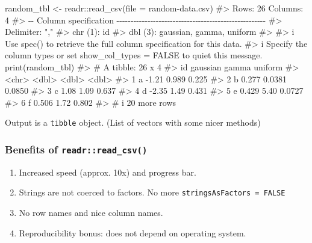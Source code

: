 \documentclass[
  letterpaper,
  DIV=11,
  numbers=noendperiod]{scrreprt}
\newenvironment{Shaded}{\begin{snugshade}}{\end{snugshade}}
\newcommand{\AttributeTok}[1]{\textcolor[rgb]{0.40,0.45,0.13}{#1}}
\newcommand{\CommentTok}[1]{\textcolor[rgb]{0.37,0.37,0.37}{#1}}
\newcommand{\FunctionTok}[1]{\textcolor[rgb]{0.28,0.35,0.67}{#1}}
\newcommand{\NormalTok}[1]{\textcolor[rgb]{0.00,0.23,0.31}{#1}}
\newcommand{\OtherTok}[1]{\textcolor[rgb]{0.00,0.23,0.31}{#1}}
\newcommand{\SpecialCharTok}[1]{\textcolor[rgb]{0.37,0.37,0.37}{#1}}
\newcommand{\StringTok}[1]{\textcolor[rgb]{0.13,0.47,0.30}{#1}}
\begin{document}
\begin{Shaded}
\begin{Highlighting}[]
\NormalTok{random\_tbl }\OtherTok{\textless{}{-}}\NormalTok{ readr}\SpecialCharTok{::}\FunctionTok{read\_csv}\NormalTok{(}\AttributeTok{file =} \StringTok{\textquotesingle{}random{-}data.csv\textquotesingle{}}\NormalTok{)}
\CommentTok{\#\textgreater{} Rows: 26 Columns: 4}
\CommentTok{\#\textgreater{} {-}{-} Column specification {-}{-}{-}{-}{-}{-}{-}{-}{-}{-}{-}{-}{-}{-}{-}{-}{-}{-}{-}{-}{-}{-}{-}{-}{-}{-}{-}{-}{-}{-}{-}{-}{-}{-}{-}{-}{-}{-}{-}{-}{-}{-}{-}{-}{-}{-}{-}{-}{-}{-}{-}{-}{-}}
\CommentTok{\#\textgreater{} Delimiter: ","}
\CommentTok{\#\textgreater{} chr (1): id}
\CommentTok{\#\textgreater{} dbl (3): gaussian, gamma, uniform}
\CommentTok{\#\textgreater{} }
\CommentTok{\#\textgreater{} i Use \textasciigrave{}spec()\textasciigrave{} to retrieve the full column specification for this data.}
\CommentTok{\#\textgreater{} i Specify the column types or set \textasciigrave{}show\_col\_types = FALSE\textasciigrave{} to quiet this message.}
\FunctionTok{print}\NormalTok{(random\_tbl)}
\CommentTok{\#\textgreater{} \# A tibble: 26 x 4}
\CommentTok{\#\textgreater{}   id    gaussian  gamma uniform}
\CommentTok{\#\textgreater{}   \textless{}chr\textgreater{}    \textless{}dbl\textgreater{}  \textless{}dbl\textgreater{}   \textless{}dbl\textgreater{}}
\CommentTok{\#\textgreater{} 1 a       {-}1.21  0.989   0.225 }
\CommentTok{\#\textgreater{} 2 b        0.277 0.0381  0.0850}
\CommentTok{\#\textgreater{} 3 c        1.08  1.09    0.637 }
\CommentTok{\#\textgreater{} 4 d       {-}2.35  1.49    0.431 }
\CommentTok{\#\textgreater{} 5 e        0.429 5.40    0.0727}
\CommentTok{\#\textgreater{} 6 f        0.506 1.72    0.802 }
\CommentTok{\#\textgreater{} \# i 20 more rows}
\end{Highlighting}
\end{Shaded}

Output is a \texttt{tibble} object. (List of vectors with some nicer
methods)

\subsubsection{\texorpdfstring{Benefits of
\texttt{readr::read\_csv()}}{Benefits of readr::read\_csv()}}\label{benefits-of-readrread_csv}

\begin{enumerate}
\def\labelenumi{\arabic{enumi}.}
\item
  Increased speed (approx. 10x) and progress bar.
\item
  Strings are not coerced to factors. No more
  \texttt{stringsAsFactors\ =\ FALSE}
\item
  No row names and nice column names.
\item
  Reproducibility bonus: does not depend on operating system.
\end{enumerate}
\end{document}
